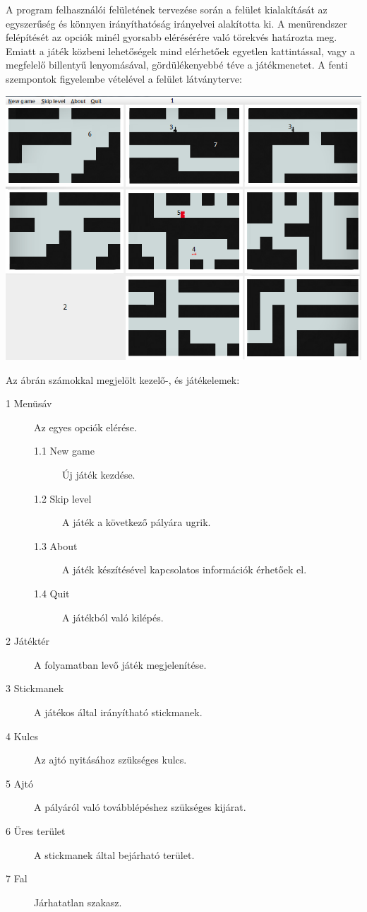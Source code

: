 	A program felhasználói felületének tervezése során a felület kialakítását az egyszerűség és könnyen irányíthatóság irányelvei alakította ki. A menürendszer  felépítését az opciók minél gyorsabb elérésérére való törekvés határozta meg. Emiatt a játék közbeni lehetőségek mind elérhetőek egyetlen kattintással, vagy a megfelelő billentyű lenyomásával, gördülékenyebbé téve a játékmenetet. A fenti szempontok figyelembe vételével a felület látványterve:
	\begin{center}
		    \includegraphics[scale=0.7]{resources/gui_own.png}
	 \end{center}
	 Az ábrán számokkal megjelölt kezelő-, és játékelemek:
	 \begin{description}	 
	  \item[1 Menüsáv] Az egyes opciók elérése.
 			\begin{description}
 			\item[1.1 New game]  Új játék kezdése.
 			\item[1.2 Skip level] A játék a következő pályára ugrik.
 			\item[1.3 About] A játék készítésével kapcsolatos információk érhetőek el.
 			\item[1.4 Quit] A játékból való kilépés.
			\end{description}
 	  \item[2 Játéktér] A folyamatban levő játék megjelenítése.
 	  \item[3 Stickmanek] A játékos által irányítható stickmanek.
 	  \item[4 Kulcs] Az ajtó nyitásához szükséges kulcs.
 	  \item[5 Ajtó] A pályáról való továbblépéshez szükséges kijárat.
 	  \item[6 Üres terület] A stickmanek által bejárható terület.
 	  \item[7 Fal] Járhatatlan szakasz.
     \end{description}

